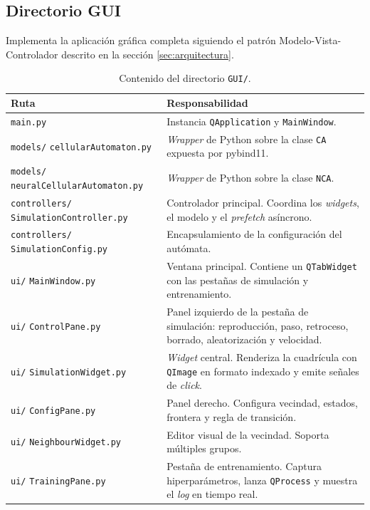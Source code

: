 \subsection{Directorio GUI}

Implementa la aplicación gráfica completa siguiendo el patrón Modelo-Vista-Controlador descrito en la sección \ref{sec:arquitectura}.

\begin{table}[H]
    \centering
    \begin{tabular}{ p{} | p{}}
        \hline
        \textbf{Ruta} & \textbf{Responsabilidad} \\ \hline
        \texttt{main.py} & Instancia \texttt{QApplication} y \texttt{MainWindow}. \\ \hline
        \texttt{models/}  \texttt{cellularAutomaton.py} & \textit{Wrapper} de Python sobre la clase \texttt{CA} expuesta por pybind11. \\ \hline
        \texttt{models/}  \texttt{neuralCellularAutomaton.py} & \textit{Wrapper} de Python sobre la clase \texttt{NCA}. \\ \hline
        \texttt{controllers/}  \texttt{SimulationController.py} & Controlador principal. Coordina los \textit{widgets}, el modelo y el \textit{prefetch} asíncrono. \\ \hline
        \texttt{controllers/}  \texttt{SimulationConfig.py} & Encapsulamiento de la configuración del autómata. \\ \hline
        \texttt{ui/}  \texttt{MainWindow.py} & Ventana principal. Contiene un \texttt{QTabWidget} con las pestañas de simulación y entrenamiento. \\ \hline
        \texttt{ui/}  \texttt{ControlPane.py} & Panel izquierdo de la pestaña de simulación: reproducción, paso, retroceso, borrado, aleatorización y velocidad. \\ \hline
        \texttt{ui/}  \texttt{SimulationWidget.py} & \textit{Widget} central. Renderiza la cuadrícula con \texttt{QImage} en formato indexado y emite señales de \textit{click}. \\ \hline
        \texttt{ui/}  \texttt{ConfigPane.py} & Panel derecho. Configura vecindad, estados, frontera y regla de transición. \\ \hline
        \texttt{ui/}  \texttt{NeighbourWidget.py} & Editor visual de la vecindad. Soporta múltiples grupos. \\ \hline
        \texttt{ui/}  \texttt{TrainingPane.py} & Pestaña de entrenamiento. Captura hiperparámetros, lanza \texttt{QProcess} y muestra el \textit{log} en tiempo real. \\ \hline
    \end{tabular}
    \caption{Contenido del directorio \texttt{GUI/}.}
\end{table}

